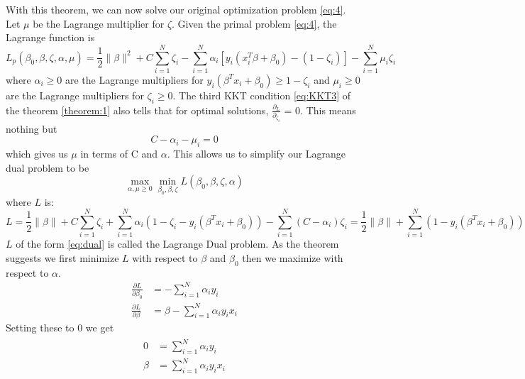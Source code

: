 \documentclass[twoside]{article}
\begin{document}
With this theorem, we can now solve our original optimization problem \ref{eq:4}. Let $\mu$ be the Lagrange multiplier for $\zeta$. Given the primal problem \ref{eq:4}, the Lagrange function is
\begin{equation} \label{eq:primal}
    L_p(\beta_{0},\beta,\zeta,\alpha,\mu) = \frac{1}{2}\|\beta\|^{2} + C\sum_{i=1}^{N}\zeta_i - \sum_{i=1}^{N}\alpha_{i}[y_i(x_i^{T}\beta+\beta_0) - (1-\zeta_i)] - \sum_{i=1}^{N}\mu_{i}\zeta_i
\end{equation}
%
where $\alpha_{i} \geq 0$ are the Lagrange multipliers for $y_{i}(\beta^{T}x_{i} + \beta_{0}) \geq 1 - \zeta_{i}$ and $\mu_{i} \geq 0$ are the Lagrange multipliers for $\zeta_{i} \geq 0$. The third KKT condition \ref{eq:KKT3} of the theorem \ref{theorem:1} also tells that for optimal solutions, $\frac{\partial_{L}}{\partial_{\zeta_{i}}}$ = 0. This means nothing but
\begin{equation*}
    C - \alpha_{i} - \mu_{i} = 0
\end{equation*}
which gives us $\mu$ in terms of C and $\alpha$. This allows us to simplify our Lagrange dual problem to be
\begin{equation*}
    \max_{\alpha,\mu \geq 0}\min_{\beta_{0}, \beta, \zeta}L(\beta_{0},\beta,\zeta,\alpha)
\end{equation*}
where $L$ is:
\begin{equation} \label{eq:dual}
    L = \frac{1}{2}\|\beta\| + C\sum_{i=1}^{N}\zeta_{i} + \sum_{i=1}^{N}\alpha_{i}(1-\zeta_{i}-y_{i}(\beta^{T}x_{i} + \beta_{0})) - \sum_{i=1}^{N}(C-\alpha_{i})\zeta_{i} = \frac{1}{2}\|\beta\| + \sum_{i=1}^{N}(1-y_{i}(\beta^{T}x_{i} + \beta_{0}))
\end{equation}
$L$ of the form \ref{eq:dual} is called the Lagrange Dual problem.
As the theorem suggests we first minimize $L$ with respect to $\beta$ and $\beta_{0}$ then we maximize with respect to $\alpha$.
\begin{align*}
    \frac{\partial{L}}{\partial{\beta_{0}}} &= -\sum_{i=1}^{N}\alpha_{i}y_{i}\\
    \frac{\partial{L}}{\partial{\beta}} &= \beta - \sum_{i=1}^{N}\alpha_{i}y_{i}x_{i}
\end{align*}
Setting these to $0$ we get
\begin{align} \label{eq:dualDerivatives}
\begin{split}
    0 &= \sum_{i=1}^{N}\alpha_{i}y_{i} \\
    \beta &= \sum_{i=1}^{N}\alpha_{i}y_{i}x_{i}
\end{split}
\end{align}
\end{document}
